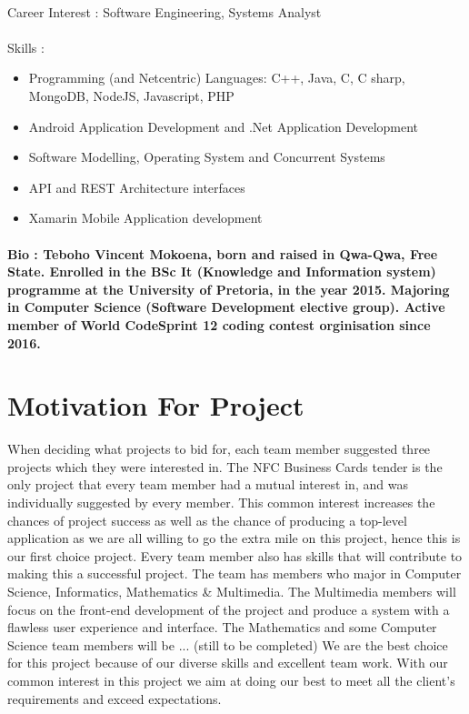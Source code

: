 \documentclass[11pt]{article}
\begin{document}
\paragraph{}Career Interest : Software Engineering, Systems Analyst
\paragraph{}Skills :
\begin{itemize}
\item Programming (and Netcentric) Languages: C++, Java, C, C sharp, MongoDB, NodeJS, Javascript, PHP
\item Android Application Development and .Net Application Development
\item Software Modelling, Operating System and Concurrent Systems
\item API and REST Architecture interfaces
\item Xamarin Mobile Application development
\end{itemize}
\paragraph{Bio : Teboho Vincent Mokoena, born and raised in Qwa-Qwa, Free State. Enrolled in
the BSc It (Knowledge and Information system) programme at the University of
Pretoria, in the year 2015. Majoring in Computer Science (Software
Development elective group). Active member of World CodeSprint 12 coding
contest orginisation since 2016.}

\section{Motivation For Project}
When deciding what projects to bid for, each team member suggested three projects which they were interested in. The NFC Business Cards tender is the only project that every team member had a mutual interest in, and was individually suggested by every member. This common interest increases the chances of project success as well as the chance of producing a top-level application as we are all willing to go the extra mile on this project, hence this is our first choice project.
\newline
\newline Every team member also has skills that will contribute to making this a successful project. The team has members who major in Computer Science, Informatics, Mathematics & Multimedia. The Multimedia members will focus on the front-end development of the project and produce a system with a flawless user experience and interface. The Mathematics and some Computer Science team members will be ... (still to be completed) 
\newline
\newline We are the best choice for this project because of our diverse skills and excellent team work. With our common interest in this project we aim at doing our best to meet all the client's requirements and exceed expectations.
\end{document}
